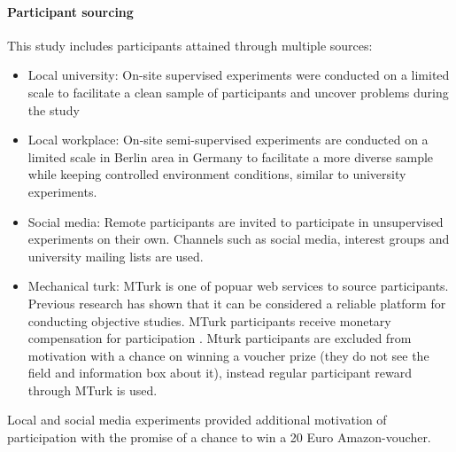 \paragraph{Participant sourcing} 
This study includes participants attained through multiple sources:
\begin{itemize}
	\item{Local university:} On-site supervised experiments were conducted on a limited scale to facilitate a clean sample of participants and uncover problems during the study
	
	\item{Local workplace:} On-site semi-supervised experiments are conducted on a limited scale in Berlin area in Germany to facilitate a more diverse sample while keeping controlled environment conditions, similar to university experiments.
	
	\item{Social media:} Remote participants are invited to participate in unsupervised experiments on their own. Channels such as social media, interest groups and university mailing lists are used.
	
	\item{Mechanical turk:} MTurk is one of popuar web services to source participants. Previous research has shown that it can be considered a reliable platform for conducting objective studies. MTurk participants receive monetary compensation for participation \cite{Buhrmester2011a}. Mturk participants are excluded from motivation with a chance on winning a voucher prize (they do not see the field and information box about it), instead regular participant reward through MTurk is used.
	
\end{itemize}

Local and social media experiments provided additional motivation of participation with the promise of a chance to win a 20 Euro Amazon-voucher.
